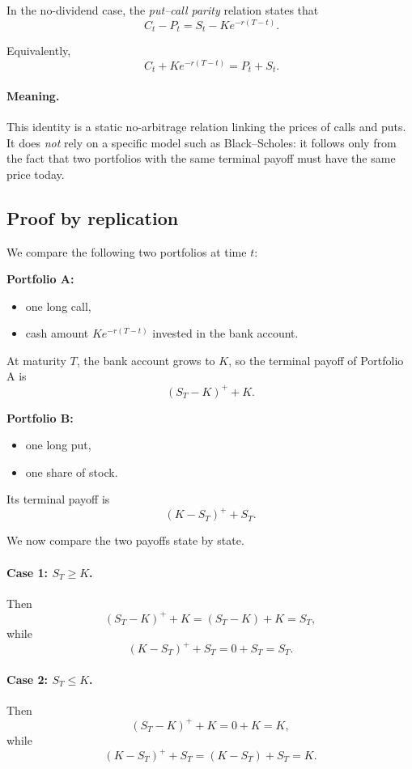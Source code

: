 \documentclass[11pt]{article}
\newcommand{\1}{\mathbf{1}}
\theoremstyle{plain}
\theoremstyle{definition}
\theoremstyle{remark}
\begin{document}
In the no-dividend case, the \emph{put--call parity} relation states that
\[
\boxed{
\ C_t-P_t = S_t - K e^{-r(T-t)}.
}
\]

Equivalently,
\[
\boxed{
\ C_t + K e^{-r(T-t)} = P_t + S_t.
}
\]

\paragraph{Meaning.}
This identity is a static no-arbitrage relation linking the prices of calls and puts.
It does \emph{not} rely on a specific model such as Black--Scholes:
it follows only from the fact that two portfolios with the same terminal payoff
must have the same price today.

\subsection{Proof by replication}

We compare the following two portfolios at time \(t\):

\medskip
\noindent
\textbf{Portfolio A:}
\begin{itemize}[leftmargin=1.4em]
    \item one long call,
    \item cash amount \(K e^{-r(T-t)}\) invested in the bank account.
\end{itemize}

At maturity \(T\), the bank account grows to \(K\), so the terminal payoff of Portfolio A is
\[
(S_T-K)^+ + K.
\]

\medskip
\noindent
\textbf{Portfolio B:}
\begin{itemize}[leftmargin=1.4em]
    \item one long put,
    \item one share of stock.
\end{itemize}

Its terminal payoff is
\[
(K-S_T)^+ + S_T.
\]

\medskip
We now compare the two payoffs state by state.

\paragraph{Case 1: \(S_T\ge K\).}
Then
\[
(S_T-K)^+ + K = (S_T-K)+K = S_T,
\]
while
\[
(K-S_T)^+ + S_T = 0 + S_T = S_T.
\]

\paragraph{Case 2: \(S_T\le K\).}
Then
\[
(S_T-K)^+ + K = 0 + K = K,
\]
while
\[
(K-S_T)^+ + S_T = (K-S_T)+S_T = K.
\]
\end{document}
